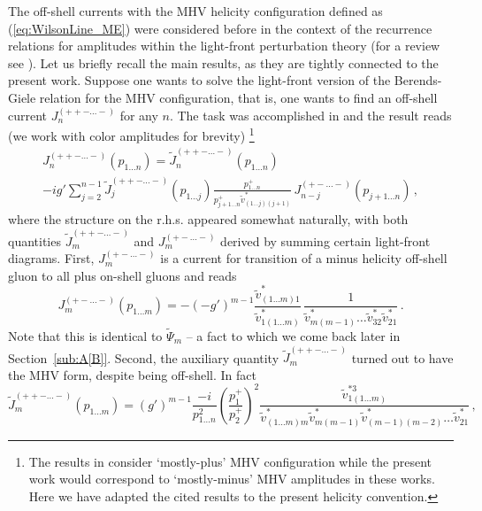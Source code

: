 \documentclass[english,american]{article}
\begin{document}
The off-shell currents with the MHV helicity configuration defined
as (\ref{eq:WilsonLine_ME}) were considered before in the context
of the recurrence relations for amplitudes within the light-front perturbation
theory \citep{Cruz-Santiago2015,Kotko2016} (for a review see \citep{Cruz-Santiago2015a}).
Let us briefly recall the main results, as they are tightly connected
to the present work. Suppose one wants to solve the light-front version
of the Berends-Giele relation for the MHV configuration, that is,
one wants to find an off-shell current $J_{n}^{\left(++-\dots-\right)}$
for any $n$. The task was accomplished in \citep{Cruz-Santiago2013}
and the result reads (we work with color amplitudes for brevity)%
\footnote{The results in \citep{Cruz-Santiago2013,Cruz-Santiago2015,Kotko2016}
consider `mostly-plus' MHV configuration while the present work would
correspond to `mostly-minus' MHV amplitudes in these works. Here we have
adapted the cited results to the present helicity convention.%
}
\begin{multline}
J_{n}^{\left(++-\dots-\right)}\left(p_{1\dots n}\right)=\tilde{J}_{n}^{\left(++-\dots-\right)}\left(p_{1\dots n}\right)\\
-ig'\sum_{j=2}^{n-1}\tilde{J}_{j}^{\left(++-\dots-\right)}\left(p_{1\dots j}\right)\frac{p_{1\dots n}^{+}}{p_{j+1\dots n}^{+}\tilde{v}_{\left(1\dots j\right)\left(j+1\right)}^{*}}\, J_{n-j}^{\left(+-\dots-\right)}\left(p_{j+1\dots n}\right)\,,\label{eq:LF_recrel}
\end{multline}
where the structure on the r.h.s. appeared somewhat naturally, with
both quantities $\tilde{J}_{m}^{\left(++-\dots-\right)}$ and $J_{m}^{\left(+-\dots-\right)}$
derived by summing certain light-front diagrams. First, $J_{m}^{\left(+-\dots-\right)}$
is a current for transition of a minus helicity off-shell gluon to
all plus on-shell gluons and reads
\begin{equation}
J_{m}^{\left(+-\dots-\right)}\left(p_{1\dots m}\right)=-\left(-g'\right)^{m-1}\frac{\tilde{v}_{\left(1\dots m\right)1}^{*}}{\tilde{v}_{1\left(1\dots m\right)}^{*}}\,\frac{1}{\tilde{v}_{m\left(m-1\right)}^{*}\dots\tilde{v}_{32}^{*}\tilde{v}_{21}^{*}}\,.
\end{equation}
Note that this is identical to $\tilde{\Psi}_{m}$ -- a fact to which
we come back later in Section~\ref{sub:A[B]}. Second, the auxiliary quantity
$\tilde{J}_{m}^{\left(++-\dots-\right)}$ turned out to have the MHV
form, despite being off-shell. In fact
\begin{equation}
\tilde{J}_{m}^{\left(++-\dots-\right)}\left(p_{1\dots m}\right)=\left(g'\right)^{m-1}\frac{-i}{p_{1\dots n}^{2}}\left(\frac{p_{1}^{+}}{p_{2}^{+}}\right)^{2}\frac{\tilde{v}_{1\left(1\dots m\right)}^{*3}}{\tilde{v}_{\left(1\dots m\right)m}^{*}\tilde{v}_{m\left(m-1\right)}^{*}\tilde{v}_{\left(m-1\right)\left(m-2\right)}^{*}\dots\tilde{v}_{21}^{*}}\,,
\end{equation}
\end{document}
